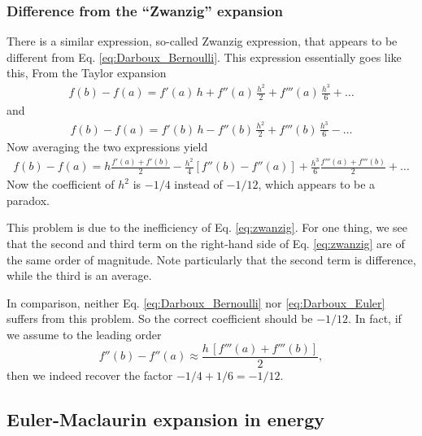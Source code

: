 \documentclass[aip,jcp,preprint,notitlepage, superscriptaddress]{revtex4-1}
\begin{document}
\subsubsection{Difference from the ``Zwanzig'' expansion}



There is a similar expression,
so-called Zwanzig expression\cite{leach},
that appears to be different from
Eq. \eqref{eq:Darboux_Bernoulli}.
%
This expression essentially goes like this,
%
From the Taylor expansion
%
\begin{align*}
f(b) - f(a)
=
f'(a) \, h
+
f''(a) \, \frac{ h^2 } { 2 }
+
f'''(a) \, \frac{ h^3 } { 6 }
+
\dots
\end{align*}
%
and
\begin{align*}
f(b) - f(a)
=
f'(b) \, h
-
f''(b) \, \frac{ h^2 } { 2 }
+
f'''(b) \, \frac{ h^3 } { 6 }
-
\dots
\end{align*}
%
Now averaging the two expressions yield
%
\begin{align}
f(b) - f(a)
=
h \frac{ f'(a) + f'(b) } { 2 }
-
\frac{ h^2}{ 4 } [ f''(b) - f''(a) ]
+
\frac{ h^3 } { 6 } \frac{ f'''(a) + f'''(b) } { 2 }
+
\dots
\label{eq:zwanzig}
\end{align}
%
Now the coefficient of $h^2$ is $-1/4$
instead of $-1/12$,
which appears to be a paradox.



This problem is due to the inefficiency of
Eq. \eqref{eq:zwanzig}.
%
For one thing,
we see that the second and third term
on the right-hand side of Eq. \eqref{eq:zwanzig}
are of the same order of magnitude.
%
Note particularly that the second term is difference,
while the third is an average.
%


In comparison,
neither Eq. \eqref{eq:Darboux_Bernoulli}
nor \eqref{eq:Darboux_Euler}
suffers from this problem.
%
So the correct coefficient should be $-1/12$.
%
In fact,
if we assume to the leading order
\[
f''(b) - f''(a)
\approx
\frac{ h \, [f'''(a) + f'''(b)] } { 2 },
\]
then we indeed recover the factor
$-1/4 + 1/6 = -1/12$.



\subsection{Euler-Maclaurin expansion in energy}
\end{document}
